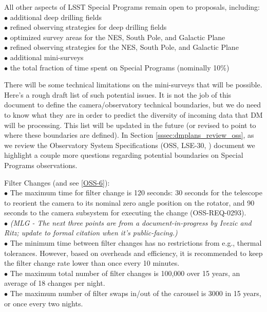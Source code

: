 \documentclass[DM,lsstdraft,toc]{lsstdoc}
\begin{document}
All other aspects of LSST Special Programs remain open to proposals, including: \\
$\bullet$ additional deep drilling fields \\
$\bullet$ refined observing strategies for deep drilling fields \\
$\bullet$ optimized survey areas for the NES, South Pole, and Galactic Plane \\
$\bullet$ refined observing strategies for the NES, South Pole, and Galactic Plane \\
$\bullet$ additional mini-surveys \\
$\bullet$ the total fraction of time spent on Special Programs (nominally 10\%)

There will be some technical limitations on the mini-surveys that will be possible. Here's a rough draft list of such potential issues. It is not the job of this document to define the camera/observatory technical boundaries, but we do need to know what they are in order to predict the diversity of incoming data that DM will be processing. This list will be updated in the future (or revised to point to where these boundaries are defined). In Section \ref{sssec:dmplans_review_oss}, as we review the Observatory System Specifications (OSS, LSE-30, \cite{LSE-30}) document we highlight a couple more questions regarding potential boundaries on Special Programs observations.

Filter Changes (and see \ref{OSS-6}): \\
$\bullet$ The maximum time for filter change is 120 seconds: 30 seconds for the telescope to reorient the camera to its nominal zero angle position on the rotator, and 90 seconds to the camera subsystem for executing the change (OSS-REQ-0293). \\
$\bullet$ \textit{(MLG - The next three points are from a document-in-progress by Ivezic and Ritz; update to formal citation when it's public-facing.)} \\
$\bullet$ The minimum time between filter changes has no restrictions from e.g., thermal tolerances. However, based on overheads and efficiency, it is recommended to keep the filter change rate lower than once every 10 minutes. \\
$\bullet$ The maximum total number of filter changes is 100,000 over 15 years, an average of 18 changes per night. \\
$\bullet$ The maximum number of filter swaps in/out of the carousel is 3000 in 15 years, or once every two nights.
\end{document}
